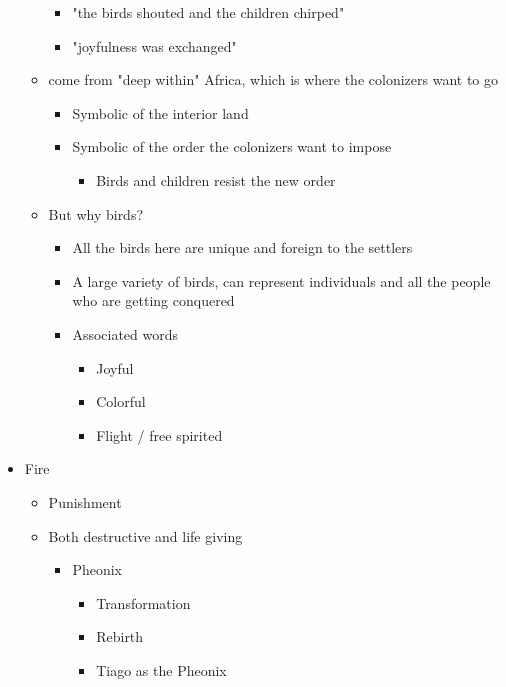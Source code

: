 \documentclass[letterpaper]{article}
\begin{document}
\begin{itemize}
\begin{itemize}
\begin{itemize}
\item "the birds shouted and the children chirped"
\item "joyfulness was exchanged"
\end{itemize}

\item come from "deep within" Africa, which is where the colonizers want
to go

\begin{itemize}
\item Symbolic of the interior land
\item Symbolic of the order the colonizers want to impose

\begin{itemize}
\item Birds and children resist the new order
\end{itemize}
\end{itemize}

\item But why birds?

\begin{itemize}
\item All the birds here are unique and foreign to the settlers
\item A large variety of birds, can represent individuals and all the
people who are getting conquered
\item Associated words

\begin{itemize}
\item Joyful
\item Colorful
\item Flight / free spirited
\end{itemize}
\end{itemize}
\end{itemize}

\item Fire

\begin{itemize}
\item Punishment
\item Both destructive and life giving

\begin{itemize}
\item Pheonix

\begin{itemize}
\item Transformation
\item Rebirth
\item Tiago as the Pheonix
\end{itemize}
\end{itemize}
\end{itemize}


\end{itemize}
\end{document}
